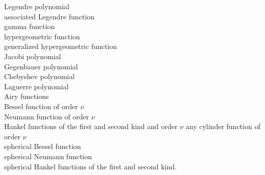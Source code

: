 Legendre polynomial\\
associated Legendre function\\
gamma function\\
hypergeometric function\\
generalized hypergeometric function\\
Jacobi polynomial\\
Gegenbauer polynomial\\
Chebyshev polynomial\\
Laguerre polynomial\\
Airy functions\\
Bessel function of order $\nu$\\
Neumann function of order $\nu$\\
Hankel functions of the first and second kind and order $\nu$ any cylinder function of order $\nu$\\
spherical Bessel function\\
spherical Neumann function\\
spherical Hankel functions of the first and second kind.
